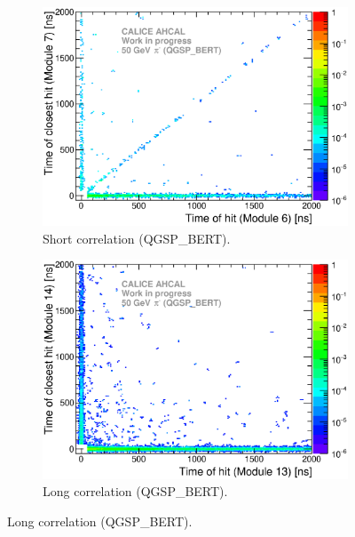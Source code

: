 \begin{figure}[htbp!]
  \begin{subfigure}[t]{0.49\textwidth}
    \centering
    \includegraphics[width=1\textwidth]{../Thesis_Plots/Timing/Pions/Plots/ComparisonToSim/Time_Correlation_50GeV_short_QGSPBERT_DD4hep.eps}
    \caption{Short correlation (QGSP\_BERT).}\label{fig:Corr_short_QGSPBERT_DD4hep}
  \end{subfigure}
  \hfill
  \begin{subfigure}[t]{0.49\textwidth}
    \centering
    \includegraphics[width=1\textwidth]{../Thesis_Plots/Timing/Pions/Plots/ComparisonToSim/Time_Correlation_50GeV_long_QGSPBERT_DD4hep.eps}
    \caption{Long correlation (QGSP\_BERT).} \label{fig:Corr_long_QGSPBERT_DD4hep}
  \end{subfigure}

\end{figure}
